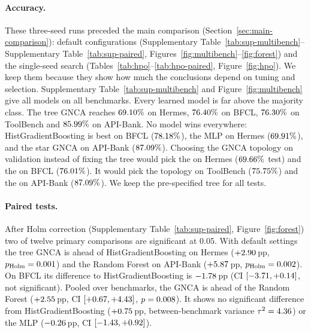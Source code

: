 \documentclass[10pt,twocolumn,letterpaper]{article}
\begin{document}
\paragraph{Accuracy.} These three-seed runs preceded the main comparison (Section~\ref{sec:main-comparison}): default configurations (Supplementary Table~\ref{tab:sup-multibench}--Supplementary Table~\ref{tab:sup-paired}, Figures~\ref{fig:multibench}--\ref{fig:forest}) and the single-seed search (Tables~\ref{tab:hpo}--\ref{tab:hpo-paired}, Figure~\ref{fig:hpo}). We keep them because they show how much the conclusions depend on tuning and selection. Supplementary Table~\ref{tab:sup-multibench} and Figure~\ref{fig:multibench} give all models on all benchmarks. Every learned model is far above the majority class. The tree GNCA reaches $69.10\%$ on Hermes, $76.40\%$ on BFCL, $76.30\%$ on ToolBench and $85.99\%$ on API-Bank. No model wins everywhere: HistGradientBoosting is best on BFCL ($78.18\%$), the MLP on Hermes ($69.91\%$), and the star GNCA on API-Bank ($87.09\%$). Choosing the GNCA topology on validation instead of fixing the tree would pick the \numVsHerModel{} on Hermes ($69.66\%$ test) and the \numVsBfclModel{} on BFCL ($76.01\%$). It would pick the \numVsTbModel{} topology on ToolBench ($75.75\%$) and the \numVsAbModel{} on API-Bank ($87.09\%$). We keep the pre-specified tree for all tests.

\paragraph{Paired tests.} After Holm correction (Supplementary Table~\ref{tab:sup-paired}, Figure~\ref{fig:forest}) two of twelve primary comparisons are significant at 0.05. With default settings the tree GNCA is ahead of HistGradientBoosting on Hermes ($+2.90$\,pp, $p_{\text{Holm}}=0.001$) and the Random Forest on API-Bank ($+5.87$\,pp, $p_{\text{Holm}}=0.002$). On BFCL its difference to HistGradientBoosting is $-1.78$\,pp (CI $[-3.71, +0.14]$, not significant). Pooled over benchmarks, the GNCA is ahead of the Random Forest ($+2.55$\,pp, CI $[+0.67, +4.43]$, $p=0.008$). It shows no significant difference from HistGradientBoosting ($+0.75$\,pp, between-benchmark variance $\tau^2=4.36$) or the MLP ($-0.26$\,pp, CI $[-1.43, +0.92]$).
\end{document}
